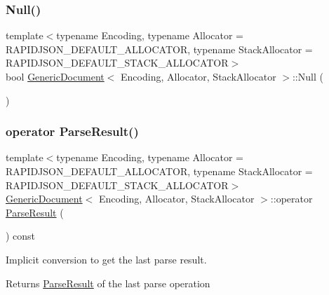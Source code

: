 \subsubsection{\texorpdfstring{Null()}{Null()}}
{\footnotesize\ttfamily template$<$typename Encoding, typename Allocator = R\+A\+P\+I\+D\+J\+S\+O\+N\+\_\+\+D\+E\+F\+A\+U\+L\+T\+\_\+\+A\+L\+L\+O\+C\+A\+T\+OR, typename Stack\+Allocator = R\+A\+P\+I\+D\+J\+S\+O\+N\+\_\+\+D\+E\+F\+A\+U\+L\+T\+\_\+\+S\+T\+A\+C\+K\+\_\+\+A\+L\+L\+O\+C\+A\+T\+OR$>$ \\
bool \hyperlink{classGenericDocument}{Generic\+Document}$<$ Encoding, Allocator, Stack\+Allocator $>$\+::Null (\begin{DoxyParamCaption}{ }\end{DoxyParamCaption})\hspace{0.3cm}{\ttfamily [inline]}}

\mbox{\label{classGenericDocument_af9bb8eade3eae0c039161378e8d2923a}} 
\subsubsection{\texorpdfstring{operator Parse\+Result()}{operator ParseResult()}}
{\footnotesize\ttfamily template$<$typename Encoding, typename Allocator = R\+A\+P\+I\+D\+J\+S\+O\+N\+\_\+\+D\+E\+F\+A\+U\+L\+T\+\_\+\+A\+L\+L\+O\+C\+A\+T\+OR, typename Stack\+Allocator = R\+A\+P\+I\+D\+J\+S\+O\+N\+\_\+\+D\+E\+F\+A\+U\+L\+T\+\_\+\+S\+T\+A\+C\+K\+\_\+\+A\+L\+L\+O\+C\+A\+T\+OR$>$ \\
\hyperlink{classGenericDocument}{Generic\+Document}$<$ Encoding, Allocator, Stack\+Allocator $>$\+::operator \hyperlink{structParseResult}{Parse\+Result} (\begin{DoxyParamCaption}{ }\end{DoxyParamCaption}) const\hspace{0.3cm}{\ttfamily [inline]}}



Implicit conversion to get the last parse result. 

\begin{DoxyReturn}{Returns}
\hyperlink{structParseResult}{Parse\+Result} of the last parse operation
\end{DoxyReturn}

